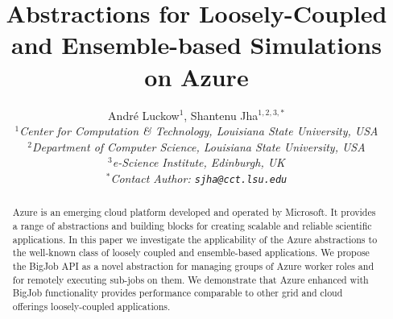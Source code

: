 \documentclass[conference,final]{IEEEtran}
\title{Abstractions for Loosely-Coupled and Ensemble-based Simulations
  on Azure\up}
\author{
Andr\'e Luckow$^{1}$, Shantenu Jha$^{1,2,3,*}$\\
  \small{\emph{$^{1}$Center for Computation \& Technology, Louisiana State University, USA}}\\
  \small{\emph{$^{2}$Department of Computer Science, Louisiana State University, USA}}\\
  \small{\emph{$^{3}$e-Science Institute, Edinburgh, UK}}\\
  \small{\emph{$^{*}$Contact Author: \texttt{sjha@cct.lsu.edu}}}\\
  \up\up\up\up
}
\newcommand{\up}{\vspace*{-1em}}
\begin{document}
 

\maketitle    

\begin{abstract}
  Azure is an emerging cloud platform developed and operated by
  Microsoft.  It provides a range of abstractions and building blocks
  for creating scalable and reliable scientific applications.  In this
  paper we investigate the applicability of the Azure abstractions to
  the well-known class of loosely coupled and ensemble-based
  applications.  We propose the BigJob API as a novel abstraction for
  managing groups of Azure worker roles and for remotely executing
  sub-jobs on them. We demonstrate that Azure enhanced with BigJob
  functionality provides performance comparable to other grid and
  cloud offerings loosely-coupled applications.  \up \up

\end{abstract}
\end{document}
